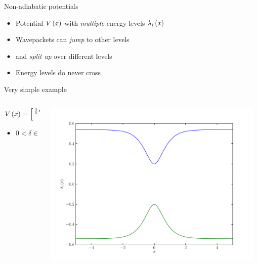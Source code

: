 \documentclass{beamer}
\begin{document}
\begin{frame}{Non-adiabatic potentials}
  \begin{itemize}
    \item Potential $V\left( x \right)$ with \emph{multiple} energy levels $\lambda_i\left( x \right)$
    \item Wavepackets can \emph{jump} to other levels
    \item and \emph{split up} over different levels
    \item Energy levels do never cross
  \end{itemize}
  Very simple example 
  \begin{columns}
    \begin{column}[T]{0.5\textwidth}
      \begin{equation*}
        V\left( x \right) = \left[\begin{smallmatrix}\frac{1}{2} \tanh{\left (x \right )} & \delta\\\delta & - \frac{1}{2} \tanh{\left (x \right )}\end{smallmatrix}\right]
      \end{equation*}
      \begin{itemize}
        \item $0 < \delta \in \mathbb{R}$
      \end{itemize}
    \end{column}
    \begin{column}[T]{0.5\textwidth}
        \includegraphics[scale=0.25]{./fig/delta_gap.pdf}
    \end{column}
  \end{columns}
\end{frame}
\end{document}
